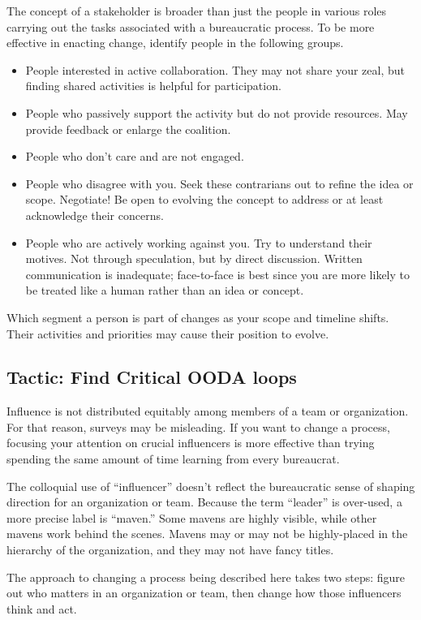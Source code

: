 The concept of a \gls{stakeholder} is broader than just the people in various roles carrying out the tasks associated with a bureaucratic process. 
To be more effective in enacting change, identify people in the following groups. 
\begin{itemize}
 \item People interested in active collaboration. They may not share your zeal, but finding shared activities is helpful for participation.
    \item People who passively support the activity but do not provide resources. May provide feedback or enlarge the coalition.
    \item People who don't care and are not engaged.
    \item People who disagree with you. Seek these contrarians out to refine the idea or scope. Negotiate! Be open to evolving the concept to address or at least acknowledge their concerns.
    \item People who are actively working against you. Try to understand their motives. Not through speculation, but by direct discussion. Written communication is inadequate; face-to-face is best since you are more likely to be treated like a human rather than an idea or concept. 
\end{itemize}

Which segment a person is part of changes as your scope and timeline shifts. Their activities and priorities may cause their position to evolve. 

\subsection*{Tactic: Find Critical OODA loops}

Influence is not distributed equitably among members of a team or organization. For that reason, surveys may be misleading. If you want to change a process, focusing your attention on crucial influencers is more effective than trying spending the same amount of time learning from every bureaucrat. 

The colloquial use of ``influencer'' doesn't reflect the bureaucratic sense of shaping direction for an organization or team. Because the term ``leader'' is over-used, a more precise label is ``maven.'' Some mavens are highly visible, while other mavens work behind the scenes.
Mavens may or may not be highly-placed in the hierarchy of the organization, and they may not have fancy titles. 

The approach to changing a process being described here takes two steps: figure out who matters in an organization or team, then change how those influencers think and act.

